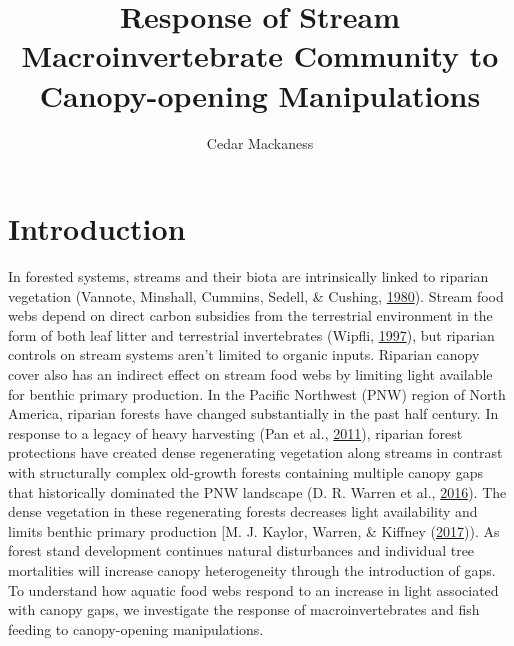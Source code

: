 \documentclass[double,12pt]{beavtex}
\title{Response of Stream Macroinvertebrate Community to Canopy-opening
Manipulations} %
\author{Cedar Mackaness} %
\begin{document}
\maketitle
\mainmatter


  \chapter*{Introduction}\label{introduction}
  
  In forested systems, streams and their biota are intrinsically linked to
  riparian vegetation (Vannote, Minshall, Cummins, Sedell, \& Cushing,
  \protect\hyperlink{ref-Vannote1980}{1980}). Stream food webs depend on
  direct carbon subsidies from the terrestrial environment in the form of
  both leaf litter and terrestrial invertebrates (Wipfli,
  \protect\hyperlink{ref-Wipfli1997}{1997}), but riparian controls on
  stream systems aren't limited to organic inputs. Riparian canopy cover
  also has an indirect effect on stream food webs by limiting light
  available for benthic primary production. In the Pacific Northwest (PNW)
  region of North America, riparian forests have changed substantially in
  the past half century. In response to a legacy of heavy harvesting (Pan
  et al., \protect\hyperlink{ref-Pan2011}{2011}), riparian forest
  protections have created dense regenerating vegetation along streams in
  contrast with structurally complex old-growth forests containing
  multiple canopy gaps that historically dominated the PNW landscape (D.
  R. Warren et al., \protect\hyperlink{ref-Warren2016Eco}{2016}). The
  dense vegetation in these regenerating forests decreases light
  availability and limits benthic primary production {[}M. J. Kaylor,
  Warren, \& Kiffney (\protect\hyperlink{ref-Kaylor2017FS}{2017})). As
  forest stand development continues natural disturbances and individual
  tree mortalities will increase canopy heterogeneity through the
  introduction of gaps. To understand how aquatic food webs respond to an
  increase in light associated with canopy gaps, we investigate the
  response of macroinvertebrates and fish feeding to canopy-opening
  manipulations.
  
\end{document}
